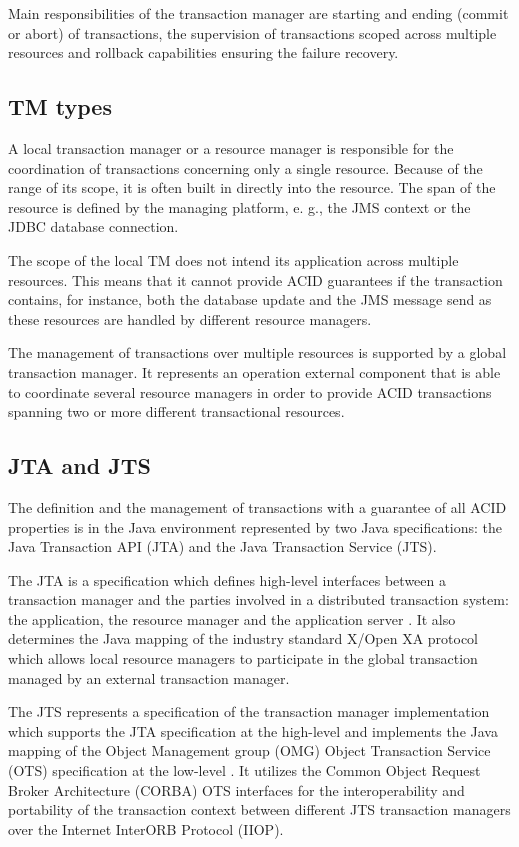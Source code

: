 \documentclass[oneside,
  digital, %
  table,   %
  lof,     %
  lot,     %
]{fithesis3}
\begin{document}
Main responsibilities of the transaction manager are starting and ending (commit or abort) of transactions, the supervision of transactions scoped across multiple resources and rollback capabilities ensuring the failure recovery. 

\subsection{TM types}

A local transaction manager or a resource manager is responsible for the coordination of transactions concerning only a single resource. Because of the range of its scope, it is often built in directly into the resource. The span of the resource is defined by the managing platform, e. g., the JMS context or the JDBC database connection.  

The scope of the local TM does not intend its application across multiple resources. This means that it cannot provide ACID guarantees if the transaction contains, for instance, both the database update and the JMS message send as these resources are handled by different resource managers.

The management of transactions over multiple resources is supported by a global transaction manager. It represents an operation external component that is able to coordinate several resource managers in order to provide ACID transactions spanning two or more different transactional resources.

\subsection{JTA and JTS}

The definition and the management of transactions with a guarantee of all ACID properties is in the Java environment represented by two Java specifications: the Java Transaction API (JTA) and the Java Transaction Service (JTS). 

The JTA is a specification which defines high-level interfaces between a transaction manager and the parties involved in a distributed transaction system: the application, the resource manager and the application server \cite{jta}. It also determines the Java mapping of the industry standard X/Open XA protocol which allows local resource managers to participate in the global transaction managed by an external transaction manager.

The JTS represents a specification of the transaction manager implementation which supports the JTA specification at the high-level and implements the Java mapping of the Object Management group (OMG) Object Transaction Service (OTS) specification at the low-level \cite{jts}. It utilizes the Common Object Request Broker Architecture (CORBA) OTS interfaces for the interoperability and portability of the transaction context between different JTS transaction managers over the Internet InterORB Protocol (IIOP).
\end{document}
